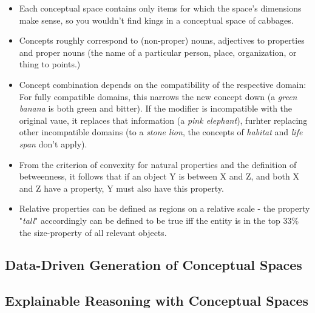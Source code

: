 \begin{itemize}
    \item Each conceptual space contains only items for which the space's dimensions make sense, so you wouldn't find kings in a conceptual space of cabbages.
    \item Concepts roughly correspond to (non-proper) nouns, adjectives to properties and proper nouns (the name of a particular person, place, organization, or thing to points.)
    \item Concept combination depends on the compatibility of the respective domain: For fully compatible domains, this narrows the new concept down (a \textit{green banana} is both green and bitter). If the modifier is incompatible with the original vaue, it replaces that information (\eg a \textit{pink elephant}), furhter replacing other incompatible domains (\eg to a \textit{stone lion}, the concepts of \textit{habitat} and \textit{life span} don't apply).
    \item From the criterion of convexity for natural properties and the definition of betweenness, it follows that if an object Y is between X and Z, and both X and Z have a property, Y must also have this property.
    \item Relative properties can be defined as regions on a relative scale - the property "\textit{tall}" acccordingly can be defined to be true iff the entity is in the top 33\% \wrt the size-property of all relevant objects.
\end{itemize}


\subsection{Data-Driven Generation of Conceptual Spaces}


\subsection{Explainable Reasoning with Conceptual Spaces}
\label{sec:reasoning}


